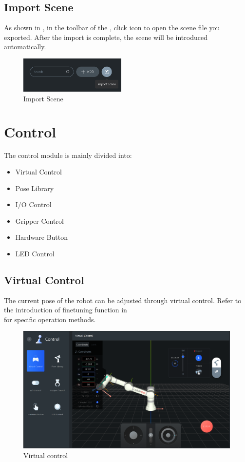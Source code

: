 \subsection{Import Scene}
\label{sec:导入场景}
As shown in , in the toolbar of the , click  icon to open the scene file you exported. After the import is complete, the scene will be introduced automatically.

\begin{figure}[htb!]
	\centering
	\includegraphics[height=1.8cm]{en/image/3-20.png}
	\caption{Import Scene}
	\label{fig:导入场景}
\end{figure}


\section{Control}
The control module is mainly divided into:
\begin{itemize}
\item Virtual Control
\item Pose Library
\item I/O Control
\item Gripper Control
\item Hardware Button
\item LED Control
\end{itemize}

\subsection{Virtual Control}
The current pose of the robot can be adjusted through virtual control.  Refer to the introduction of fine­tuning function in \\ for specific operation methods.

\begin{figure}[ht]
	\centering
	\includegraphics[width=\textwidth]{en/image/3-21.png}
	\caption{Virtual control}
	\label{fig:虚拟控制示意图}
\end{figure}

